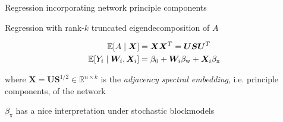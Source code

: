\documentclass{beamer}
\theoremstyle{remark}
\newcommand{\X}{\bm X}
\newcommand{\W}{\bm W}
\newcommand{\Spop}{\bm S}
\newcommand{\Upop}{\bm U}
\newcommand{\betazero}{\beta_0}
\DeclarePairedDelimiter{\brac}{[}{]}
\newcommand{\E}[2][]{%
   \ifthenelse{ \equal{#1}{} }
      {\ensuremath{\mathbb{E} \brac*{#2}}}
      {\ensuremath{\mathbb{E} \brac*{#2 \mid #1}}}
}
\begin{document}
\begin{frame}{Regression incorporating network principle components}

    Regression with rank-$k$ truncated eigendecomposition of $A$

    \begin{align*}
        \E[\X]{A}           & = \X \X^T = \Upop \Spop \Upop^T                         \\
        \E[\W_i, \X_i]{Y_i} & = \betazero + \W_i \beta_\text{w} + \X_i \beta_\text{x}
    \end{align*}

    where $\X = \Upop \Spop^{1/2} \in \mathbb{R}^{n \times k}$ is the \emph{adjacency spectral embedding}, i.e. principle components, of the network

    $\beta_\text{x}$ has a nice interpretation under stochastic blockmodels

\end{frame}
\end{document}

